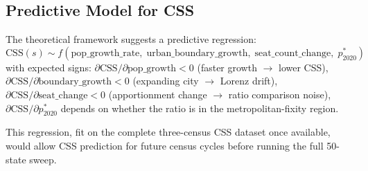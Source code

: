 \subsection{Predictive Model for CSS}

The theoretical framework suggests a predictive regression:
\[
  \mathrm{CSS}(s) \sim f(\text{pop\_growth\_rate},\; \text{urban\_boundary\_growth},\;
                        \text{seat\_count\_change},\; p^*_{2020})
\]
with expected signs:
$\partial\mathrm{CSS}/\partial\text{pop\_growth} < 0$ (faster growth
$\to$ lower CSS),
$\partial\mathrm{CSS}/\partial\text{boundary\_growth} < 0$ (expanding
city $\to$ Lorenz drift),
$\partial\mathrm{CSS}/\partial\text{seat\_change} < 0$ (apportionment
change $\to$ ratio comparison noise),
$\partial\mathrm{CSS}/\partial p^*_{2020}$ depends on whether the ratio
is in the metropolitan-fixity region.

This regression, fit on the complete three-census CSS dataset once available,
would allow CSS prediction for future census cycles before running the full
50-state sweep.
